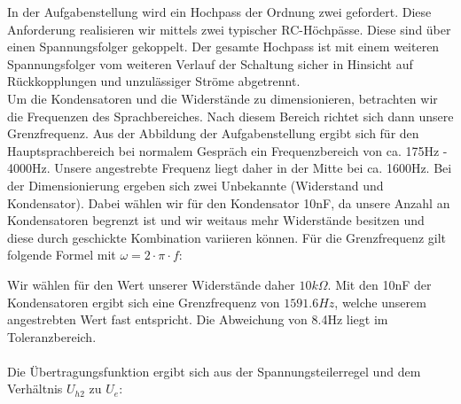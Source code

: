 In der Aufgabenstellung wird ein Hochpass der Ordnung zwei gefordert. Diese Anforderung realisieren wir mittels zwei typischer RC-Höchpässe. Diese sind über einen Spannungsfolger gekoppelt. Der gesamte Hochpass ist mit einem weiteren Spannungsfolger vom weiteren Verlauf der Schaltung sicher in Hinsicht auf Rückkopplungen und unzulässiger Ströme abgetrennt.
\\
Um die Kondensatoren und die Widerstände zu dimensionieren, betrachten wir die Frequenzen des Sprachbereiches. Nach diesem Bereich richtet sich dann unsere Grenzfrequenz. Aus der Abbildung der Aufgabenstellung ergibt sich für den Hauptsprachbereich bei normalem Gespräch ein Frequenzbereich von ca. 175Hz - 4000Hz. Unsere angestrebte Frequenz liegt daher in der Mitte bei ca. 1600Hz. Bei der Dimensionierung ergeben sich zwei Unbekannte (Widerstand und Kondensator). Dabei wählen wir für den Kondensator 10nF, da unsere Anzahl an Kondensatoren begrenzt ist und wir weitaus mehr Widerstände besitzen und diese durch geschickte Kombination variieren können. Für die Grenzfrequenz gilt folgende Formel mit $\omega = 2\cdot \pi \cdot f$: 


Wir wählen für den Wert unserer Widerstände daher $10k\Omega$. Mit den 10nF der Kondensatoren ergibt sich eine Grenzfrequenz von $1591.6Hz$, welche unserem angestrebten Wert fast entspricht. Die Abweichung von 8.4Hz liegt im Toleranzbereich.
\\
\\
Die Übertragungsfunktion ergibt sich aus der Spannungsteilerregel und dem Verhältnis $U_{h2}$ zu $U_{e}$:

